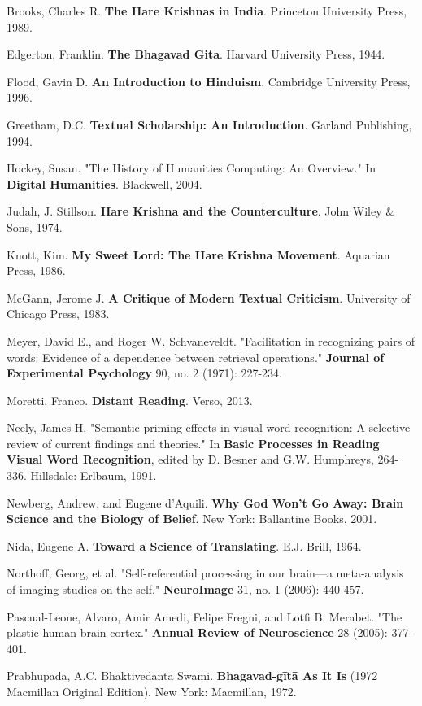 \documentclass[11pt,twoside]{book}
\begin{document}
Brooks, Charles R. \textbf{The Hare Krishnas in India}. Princeton University Press, 1989.

Edgerton, Franklin. \textbf{The Bhagavad Gita}. Harvard University Press, 1944.

Flood, Gavin D. \textbf{An Introduction to Hinduism}. Cambridge University Press, 1996.

Greetham, D.C. \textbf{Textual Scholarship: An Introduction}. Garland Publishing, 1994.

Hockey, Susan. "The History of Humanities Computing: An Overview." In \textbf{Digital Humanities}. Blackwell, 2004.

Judah, J. Stillson. \textbf{Hare Krishna and the Counterculture}. John Wiley \& Sons, 1974.

Knott, Kim. \textbf{My Sweet Lord: The Hare Krishna Movement}. Aquarian Press, 1986.

McGann, Jerome J. \textbf{A Critique of Modern Textual Criticism}. University of Chicago Press, 1983.

Meyer, David E., and Roger W. Schvaneveldt. "Facilitation in recognizing pairs of words: Evidence of a dependence between retrieval operations." \textbf{Journal of Experimental Psychology} 90, no. 2 (1971): 227-234.

Moretti, Franco. \textbf{Distant Reading}. Verso, 2013.

Neely, James H. "Semantic priming effects in visual word recognition: A selective review of current findings and theories." In \textbf{Basic Processes in Reading Visual Word Recognition}, edited by D. Besner and G.W. Humphreys, 264-336. Hillsdale: Erlbaum, 1991.

Newberg, Andrew, and Eugene d'Aquili. \textbf{Why God Won't Go Away: Brain Science and the Biology of Belief}. New York: Ballantine Books, 2001.

Nida, Eugene A. \textbf{Toward a Science of Translating}. E.J. Brill, 1964.

Northoff, Georg, et al. "Self-referential processing in our brain—a meta-analysis of imaging studies on the self." \textbf{NeuroImage} 31, no. 1 (2006): 440-457.

Pascual-Leone, Alvaro, Amir Amedi, Felipe Fregni, and Lotfi B. Merabet. "The plastic human brain cortex." \textbf{Annual Review of Neuroscience} 28 (2005): 377-401.

Prabhupāda, A.C. Bhaktivedanta Swami. \textbf{Bhagavad-gītā As It Is} (1972 Macmillan Original Edition). New York: Macmillan, 1972.
\end{document}
